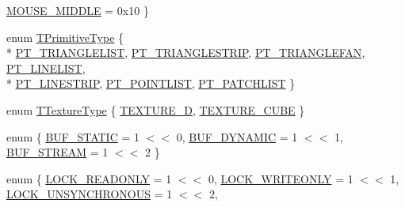 \begin{DoxyCompactItemize}
\hyperlink{namespace_agmd_a90881f7c09801574513d1b7bb9f10d71a0a906ef111c904d9dee1cef83238b51e}{M\+O\+U\+S\+E\+\_\+\+M\+I\+D\+D\+L\+E} = 0x10
 \}
\item 
enum \hyperlink{namespace_agmd_a0e38d0c34891ddd6eef72e1c9e55161c}{T\+Primitive\+Type} \{ \\*
\hyperlink{namespace_agmd_a0e38d0c34891ddd6eef72e1c9e55161cab69ba56275be85816ef36f97ee57a0cf}{P\+T\+\_\+\+T\+R\+I\+A\+N\+G\+L\+E\+L\+I\+S\+T}, 
\hyperlink{namespace_agmd_a0e38d0c34891ddd6eef72e1c9e55161ca73c405cab43cf1a589051c72a91eefd5}{P\+T\+\_\+\+T\+R\+I\+A\+N\+G\+L\+E\+S\+T\+R\+I\+P}, 
\hyperlink{namespace_agmd_a0e38d0c34891ddd6eef72e1c9e55161caec08b0986a7df824f01be95984107b8d}{P\+T\+\_\+\+T\+R\+I\+A\+N\+G\+L\+E\+F\+A\+N}, 
\hyperlink{namespace_agmd_a0e38d0c34891ddd6eef72e1c9e55161ca299431369b3cfd34a6fad5b4f631fcbc}{P\+T\+\_\+\+L\+I\+N\+E\+L\+I\+S\+T}, 
\\*
\hyperlink{namespace_agmd_a0e38d0c34891ddd6eef72e1c9e55161cace44484b104db7c4792051e37b2e9eda}{P\+T\+\_\+\+L\+I\+N\+E\+S\+T\+R\+I\+P}, 
\hyperlink{namespace_agmd_a0e38d0c34891ddd6eef72e1c9e55161ca229d4a7bf38cdf40be3775ae30376b74}{P\+T\+\_\+\+P\+O\+I\+N\+T\+L\+I\+S\+T}, 
\hyperlink{namespace_agmd_a0e38d0c34891ddd6eef72e1c9e55161ca3ba3835fd0070442ea747edd786a2519}{P\+T\+\_\+\+P\+A\+T\+C\+H\+L\+I\+S\+T}
 \}
\item 
enum \hyperlink{namespace_agmd_a7036bece09449a930cfec410f75e85f4}{T\+Texture\+Type} \{ \hyperlink{namespace_agmd_a7036bece09449a930cfec410f75e85f4a337588dae252a993034541482655f94d}{T\+E\+X\+T\+U\+R\+E\+\_\+D}, 
\hyperlink{namespace_agmd_a7036bece09449a930cfec410f75e85f4ae453da0d3d8ecd27d14d085b049790f3}{T\+E\+X\+T\+U\+R\+E\+\_\+\+C\+U\+B\+E}
 \}
\item 
enum \{ \hyperlink{namespace_agmd_af49c822362962870a2c311ae935c14eaad9a0925d5f4e1cea7d18a94fca40fb7e}{B\+U\+F\+\_\+\+S\+T\+A\+T\+I\+C} = 1 $<$$<$ 0, 
\hyperlink{namespace_agmd_af49c822362962870a2c311ae935c14eaa04c5680ef4a8702d889214a215479ce9}{B\+U\+F\+\_\+\+D\+Y\+N\+A\+M\+I\+C} = 1 $<$$<$ 1, 
\hyperlink{namespace_agmd_af49c822362962870a2c311ae935c14eaa262f7e58757b9867002a54d48351d5ac}{B\+U\+F\+\_\+\+S\+T\+R\+E\+A\+M} = 1 $<$$<$ 2
 \}
\item 
enum \{ \hyperlink{namespace_agmd_af32ffe4a7e9620d12aec25e2d030000caff8d6a83066700f666f03036d249962f}{L\+O\+C\+K\+\_\+\+R\+E\+A\+D\+O\+N\+L\+Y} = 1 $<$$<$ 0, 
\hyperlink{namespace_agmd_af32ffe4a7e9620d12aec25e2d030000ca0814330a5f2084b206421abd2af3e77c}{L\+O\+C\+K\+\_\+\+W\+R\+I\+T\+E\+O\+N\+L\+Y} = 1 $<$$<$ 1, 
\hyperlink{namespace_agmd_af32ffe4a7e9620d12aec25e2d030000ca5158c4d56f6a482fe4586ac834edecd7}{L\+O\+C\+K\+\_\+\+U\+N\+S\+Y\+N\+C\+H\+R\+O\+N\+O\+U\+S} = 1 $<$$<$ 2, 

\end{DoxyCompactItemize}
